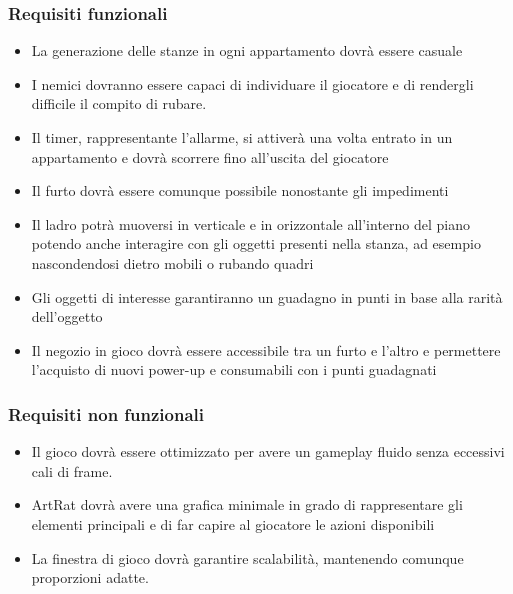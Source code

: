\documentclass[a4paper,12pt]{report}
\begin{document}
\subsubsection{Requisiti funzionali}
\begin{itemize}
    \item La generazione delle stanze in ogni appartamento dovrà essere casuale
    \item I nemici dovranno essere capaci di individuare il giocatore e di rendergli difficile il compito di rubare.
    \item Il timer, rappresentante l'allarme, si attiverà una volta entrato in un appartamento e dovrà scorrere fino all'uscita del giocatore
    \item Il furto dovrà essere comunque possibile nonostante gli impedimenti
    \item Il ladro potrà muoversi in verticale e in orizzontale all'interno del piano potendo anche interagire con gli oggetti presenti nella stanza, ad esempio nascondendosi dietro mobili o rubando quadri
    \item Gli oggetti di interesse garantiranno un guadagno in punti in base alla rarità dell'oggetto
    \item Il negozio in gioco dovrà essere accessibile tra un furto e l'altro e permettere l'acquisto di nuovi power-up e consumabili con i punti guadagnati
\end{itemize}

\subsubsection{Requisiti non funzionali}
\begin{itemize}
    \item Il gioco dovrà essere ottimizzato per avere un gameplay fluido senza eccessivi cali di frame.
    \item ArtRat dovrà avere una grafica minimale in grado di rappresentare gli elementi principali e di far capire al giocatore le azioni disponibili
    \item La finestra di gioco dovrà garantire scalabilità, mantenendo comunque proporzioni adatte.
\end{itemize}

\clearpage
\end{document}
